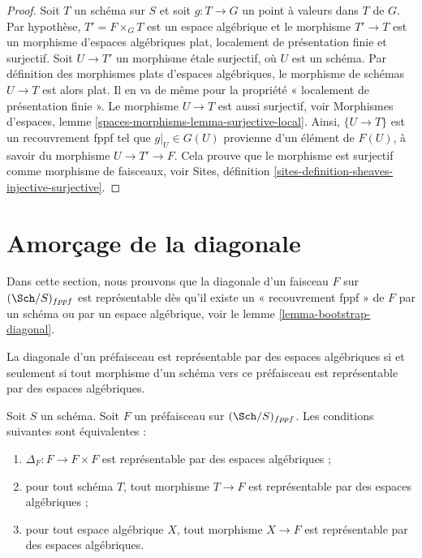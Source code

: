 \begin{proof}
Soit $T$ un schéma sur $S$ et soit $g : T \to G$ un point à valeurs dans
$T$ de $G$. Par hypothèse, $T' = F \times_G T$ est un espace algébrique et
le morphisme $T' \to T$ est un morphisme d'espaces algébriques plat,
localement de présentation finie et surjectif.
Soit $U \to T'$ un morphisme étale surjectif, où $U$ est un schéma.
Par définition des morphismes plats d'espaces algébriques,
le morphisme de schémas $U \to T$ est alors plat. Il en va de même pour la
propriété « localement de présentation finie ». Le morphisme $U \to T$ est aussi surjectif,
voir
Morphismes d'espaces, lemme \ref{spaces-morphisms-lemma-surjective-local}.
Ainsi, $\{U \to T\}$ est un recouvrement fppf tel
que $g|_U \in G(U)$ provienne d'un élément de $F(U)$, à savoir du
morphisme $U \to T' \to F$. Cela prouve que le morphisme est surjectif comme
morphisme de faisceaux, voir
Sites, définition \ref{sites-definition-sheaves-injective-surjective}.
\end{proof}




\section{Amorçage de la diagonale}
\label{section-bootstrap-diagonal}

\noindent
Dans cette section, nous prouvons que la diagonale d'un faisceau $F$ sur
$(\Sch/S)_{fppf}$ est représentable dès qu'il existe
un « recouvrement fppf » de $F$ par un schéma ou par un espace algébrique, voir le
lemme \ref{lemma-bootstrap-diagonal}.

\begin{lemma}
\label{lemma-representable-diagonal}
\begin{slogan}
La diagonale d'un préfaisceau est représentable par des espaces algébriques si et seulement si
tout morphisme d'un schéma vers ce préfaisceau est représentable par des espaces algébriques.
\end{slogan}
Soit $S$ un schéma.
Soit $F$ un préfaisceau sur $(\Sch/S)_{fppf}$.
Les conditions suivantes sont équivalentes :
\begin{enumerate}
\item $\Delta_F : F \to F \times F$ est représentable par des espaces algébriques ;
\item pour tout schéma $T$, tout morphisme $T \to F$ est représentable par des espaces
algébriques ;
\item pour tout espace algébrique $X$, tout morphisme $X \to F$ est représentable
par des espaces algébriques.
\end{enumerate}
\end{lemma}

